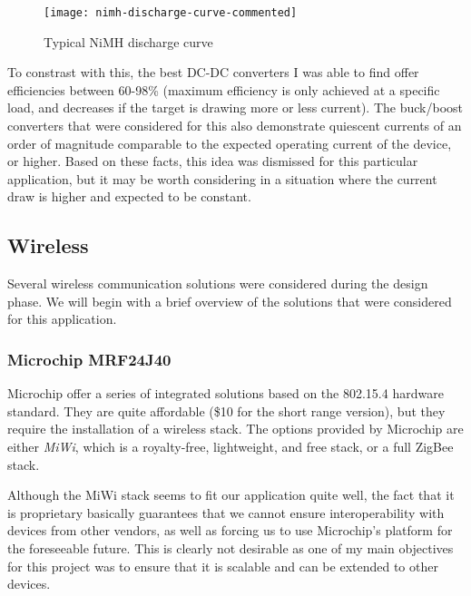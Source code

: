 \begin{figure}[!h]
  \begin{center}
    \texttt{[image: nimh-discharge-curve-commented]}
  \end{center}
  \caption{Typical NiMH discharge curve}
  \label{fig:discharge-curve}
\end{figure}


To constrast with this, the best DC-DC converters I was able to find offer
efficiencies between 60-98\% (maximum efficiency is only achieved at a specific
load, and decreases if the target is drawing more or less current). The
buck/boost converters that were considered for this also demonstrate quiescent
currents of an order of magnitude comparable to the expected operating current
of the device, or higher. Based on these facts, this idea was dismissed for this
particular application, but it may be worth considering in a situation where the
current draw is higher and expected to be constant.


\subsection{Wireless}
\label{sub:wireless}

Several wireless communication solutions were considered during the design
phase. We will begin with a brief overview of the solutions that were considered
for this application.

\subsubsection{Microchip MRF24J40}

Microchip offer a series of integrated solutions
based on the 802.15.4
hardware standard. They are quite affordable (\$10 for the short range version),
but they require the installation of a wireless stack. The options provided by
Microchip are either \emph{MiWi}, which is a royalty-free, lightweight, and free
stack, or a full ZigBee stack.

Although the MiWi stack seems to fit our application quite well, the fact that
it is proprietary basically guarantees that we cannot ensure interoperability
with devices from other vendors, as well as forcing us to use Microchip's
platform for the foreseeable future. This is clearly not desirable as one of my
main objectives for this project was to ensure that it is scalable and can be
extended to other devices.

